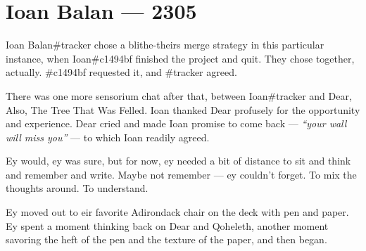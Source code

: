 \hypertarget{ioan-balan-2305}{%
\chapter*{Ioan Balan — 2305}\label{ioan-balan-2305}}

Ioan Balan\#tracker chose a blithe-theirs merge strategy in this particular instance, when Ioan\#c1494bf finished the project and quit. They chose together, actually. \#c1494bf requested it, and \#tracker agreed.

There was one more sensorium chat after that, between Ioan\#tracker and Dear, Also, The Tree That Was Felled. Ioan thanked Dear profusely for the opportunity and experience. Dear cried and made Ioan promise to come back — \emph{``your wall will miss you''} — to which Ioan readily agreed.

Ey would, ey was sure, but for now, ey needed a bit of distance to sit and think and remember and write. Maybe not remember — ey couldn't forget. To mix the thoughts around. To understand.

Ey moved out to eir favorite Adirondack chair on the deck with pen and paper. Ey spent a moment thinking back on Dear and Qoheleth, another moment savoring the heft of the pen and the texture of the paper, and then began.
